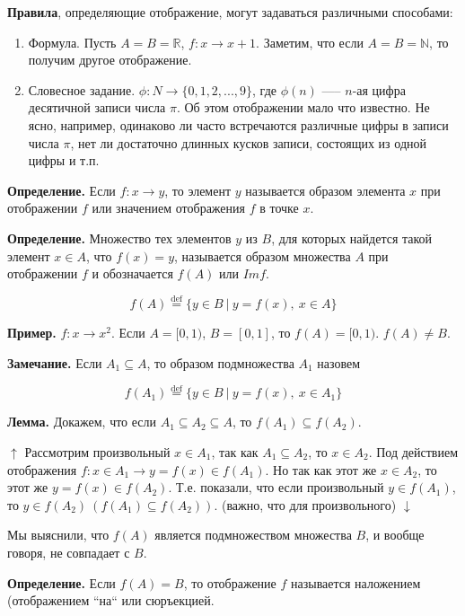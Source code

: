 \documentclass{article}
\begin{document}
    \textbf{Правила}, определяющие отображение, могут задаваться различными способами:

    \begin{enumerate}
        \item Формула. Пусть $A = B = \mathbb{R}$, $f: x \rightarrow x + 1$. Заметим, что если $A = B = \mathbb{N}$, то получим другое отображение.
        \item Словесное задание. $\phi: N \rightarrow \{0,1,2,...,9\}$, где $\phi(n)$ —-- $n$-ая цифра десятичной записи числа $\pi$. Об этом отображении мало что известно. Не ясно, например, одинаково ли часто встречаются различные цифры в записи числа $\pi$, нет ли достаточно длинных кусков записи, состоящих из одной цифры и т.п.
    \end{enumerate}

    \textbf{Определение.} Если $f: x \rightarrow y$, то элемент $y$ называется образом элемента $x$ при отображении $f$ или значением отображения $f$ в точке $x$.

    \textbf{Определение.} Множество тех элементов $y$ из $B$, для которых найдется такой элемент $x \in A$, что $f(x) = y$, называется образом множества $A$ при отображении $f$ и обозначается $f(A)$ или $Im f$.

    \[f(A) \overset{\mathrm{def}}{=} \{y \in B\ |\ y = f(x),\ x \in A\}\]

    \textbf{Пример.} $f: x \rightarrow x^2$. Если $A = [0, 1)$, $B = [0, 1]$, то $f(A) = [0, 1)$. $f(A) \neq B$.

    \textbf{Замечание.} Если $A_1 \subseteq A$, то образом подмножества $A_1$ назовем

    \[f(A_1) \overset{\mathrm{def}}{=} \{y \in B\ |\ y = f(x),\ x \in A_1\}\]

    \textbf{Лемма.} Докажем, что если $A_1 \subseteq A_2 \subseteq A$, то $f(A_1) \subseteq f(A_2)$.

    $\uparrow$ Рассмотрим произвольный $x \in A_1$, так как $A_1 \subseteq A_2$, то $x \in A_2$. Под действием отображения $f: x \in A_1 \rightarrow y = f(x) \in f(A_1)$. Но так как этот же $x \in A_2$, то этот же $y = f(x) \in f(A_2)$. Т.е. показали, что если произвольный $y \in f(A_1)$, то $y \in f(A_2)\ (f(A_1) \subseteq f(A_2))$. (важно, что для произвольного) $\downarrow$

    Мы выяснили, что $f(A)$ является подмножеством множества $B$, и вообще говоря, не совпадает с $B$.

    \textbf{Определение.} Если $f(A) = B$, то отображение $f$ называется наложением (отображением ``на`` или сюръекцией.
\end{document}
